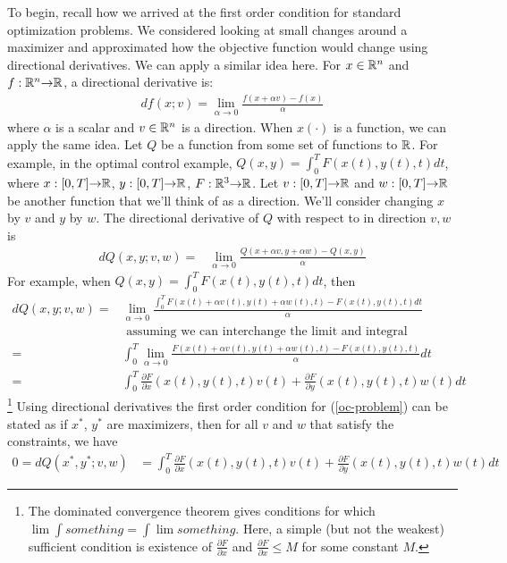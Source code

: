 To begin, recall how we arrived at the first order condition for
standard optimization problems. We considered looking at small changes
around a maximizer and approximated how the objective function would
change using directional derivatives. We can apply a similar idea
here. For $x \in \mathbb{R}^n$ and $f: \mathbb{R}^n {\rightarrow} \mathbb{R}$, a directional derivative
is:
\begin{align*}
  df(x;v) = \lim_{\alpha \to 0} \frac{f(x + \alpha v)-f(x)}{\alpha}
\end{align*}
where $\alpha$ is a scalar and $v \in \mathbb{R}^n$ is a direction. When
$x(\cdot)$ is a function, we can apply the same idea. Let $Q$ be a
function from some set of functions to $\mathbb{R}$. For example, in the
optimal control example, $Q(x,y) = \int_0^T F(x(t),y(t),t)dt$, where
$x:[0,T] {\rightarrow} \mathbb{R}$, $y:[0,T] {\rightarrow} \mathbb{R}$, $F:\mathbb{R}^3 {\rightarrow} \mathbb{R}$. Let
$v:[0,T] {\rightarrow} \mathbb{R}$ and $w:[0,T] {\rightarrow} \mathbb{R}$ be another function that we'll
think of as a direction. We'll consider changing $x$ by $v$ and $y$ by
$w$. The directional derivative of $Q$ with respect to in direction
$v,w$ is
\begin{align*}
  dQ(x,y;v,w) = & \lim_{\alpha \to 0} \frac{Q(x+\alpha v, y + \alpha w) -
  Q(x,y)}{\alpha} 
\end{align*}
For example, when $Q(x,y) = \int_0^T F(x(t),y(t),t)dt$, then
\begin{align*}
  dQ(x,y;v,w) =  & \lim_{\alpha \to 0} \frac{\int_0^T F(x(t) + \alpha
                   v(t),y(t) + \alpha w(t),t) -  F(x(t),y(t),t)dt} {\alpha} \\
  & \text{ assuming we can interchange the limit and integral } \\
  = & \int_0^T \lim_{\alpha \to 0} \frac{F(x(t) + \alpha
                   v(t),y(t) + \alpha w(t),t) -  F(x(t),y(t),t)} {\alpha} dt \\
  = & \int_0^T \frac{\partial F}{\partial x}(x(t),y(t),t)v(t) +
      \frac{\partial F}{\partial y}(x(t),y(t),t) w(t) dt
\end{align*}
\footnote{The dominated convergence theorem gives conditions for which
  $\lim \int something = \int \lim something$. Here, a simple (but not
  the weakest) sufficient condition is existence of 
  $\frac{\partial F}{\partial x}$ and
  $\frac{\partial F}{\partial x} \leq M$ for some constant $M$.}
Using directional derivatives the first order condition for
(\ref{oc-problem}) can be stated as if $x^*$, $y^*$ are maximizers,
then for all $v$ and $w$ that satisfy the constraints, we have
\begin{align}
  0 = dQ(x^*,y^*;v,w) & = \int_0^T \frac{\partial F}{\partial x}(x(t),y(t),t)v(t) +
      \frac{\partial F}{\partial y}(x(t),y(t),t) w(t) dt \label{xfoc}
\end{align}
